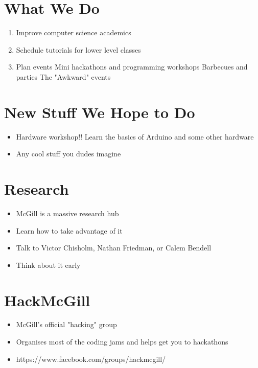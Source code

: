 \section{What We Do}

\begin{enumerate}
	\item Improve computer science academics
	\item Schedule tutorials for lower level classes
	\item Plan events
		\subitem Mini hackathons and programming workshops
		\subitem Barbecues and parties
		\subitem The "Awkward" events
\end{enumerate}

\clearpage

\section{New Stuff We Hope to Do}

\begin{itemize}
	\item Hardware workshop!!  Learn the basics of Arduino and some other hardware
	\item Any cool stuff you dudes imagine
\end{itemize}

\clearpage

\section{Research}

	\begin{itemize}
		\item McGill is a massive research hub
		\item Learn how to take advantage of it
		\item Talk to Victor Chisholm, Nathan Friedman, or Calem Bendell
		\item Think about it early
	\end{itemize}
	
\clearpage

\section{HackMcGill}

	\begin{itemize}
		\item McGill's official "hacking" group
		\item Organises most of the coding jams and helps get you to hackathons
		\item https://www.facebook.com/groups/hackmcgill/
	\end{itemize}
	
